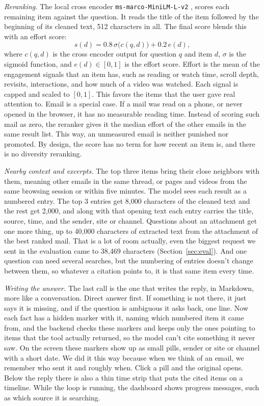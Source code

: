 \documentclass[conference]{IEEEtran}
\newcommand{\rerankmodel}{\texttt{ms\allowbreak-marco\allowbreak-MiniLM\allowbreak-L\allowbreak-6\allowbreak-v2}}
\begin{document}
\textit{Reranking.} The local cross encoder \rerankmodel{} \cite{b10}, \cite{b11} scores each remaining item against the question. It reads the title of the item followed by the beginning of its cleaned text, 512 characters in all. The final score blends this with an effort score:
\begin{equation}
s(d) = 0.8\,\sigma\big(c(q,d)\big) + 0.2\,e(d), \label{eq:final}
\end{equation}
where $c(q,d)$ is the cross encoder output for question $q$ and item $d$, $\sigma$ is the sigmoid function, and $e(d) \in [0,1]$ is the effort score. Effort is the mean of the engagement signals that an item has, such as reading or watch time, scroll depth, revisits, interactions, and how much of a video was watched. Each signal is capped and scaled to $[0,1]$. This favors the items that the user gave real attention to. Email is a special case. If a mail was read on a phone, or never opened in the browser, it has no measurable reading time. Instead of scoring such mail as zero, the reranker gives it the median effort of the other emails in the same result list. This way, an unmeasured email is neither punished nor promoted. By design, the score has no term for how recent an item is, and there is no diversity reranking.

\textit{Nearby context and excerpts.} The top three items bring their close neighbors with them, meaning other emails in the same thread, or pages and videos from the same browsing session or within five minutes. The model sees each result as a numbered entry. The top 3 entries get 8,000 characters of the cleaned text and the rest get 2,000, and along with that opening text each entry carries the title, source, time, and the sender, site or channel. Questions about an attachment get one more thing, up to 40,000 characters of extracted text from the attachment of the best ranked mail. That is a lot of room actually, even the biggest request we sent in the evaluation came to 38,469 characters (Section~\ref{sec:eval}). And one question can need several searches, but the numbering of entries doesn't change between them, so whatever a citation points to, it is that same item every time.

\textit{Writing the answer.} The last call is the one that writes the reply, in Markdown, more like a conversation. Direct answer first. If something is not there, it just says it is missing, and if the question is ambiguous it asks back, one line. Now each fact has a hidden marker with it, naming which numbered item it came from, and the backend checks these markers and keeps only the ones pointing to items that the tool actually returned, so the model can't cite something it never saw. On the screen these markers show up as small pills, sender or site or channel with a short date. We did it this way because when we think of an email, we remember who sent it and roughly when. Click a pill and the original opens. Below the reply there is also a thin time strip that puts the cited items on a timeline. While the loop is running, the dashboard shows progress messages, such as which source it is searching.
\end{document}
